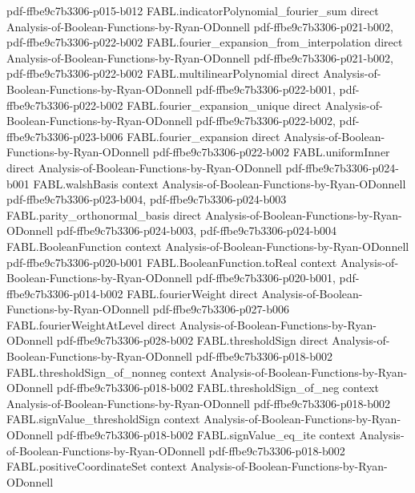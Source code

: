 \begin{theorem}
  {pdf-ffbe9c7b3306-p015-b012}
\proofstep
  {FABL.indicatorPolynomial_fourier_sum}
  {direct}
  {Analysis-of-Boolean-Functions-by-Ryan-ODonnell}
  {pdf-ffbe9c7b3306-p021-b002,
    pdf-ffbe9c7b3306-p022-b002}
\proofstep
  {FABL.fourier_expansion_from_interpolation}
  {direct}
  {Analysis-of-Boolean-Functions-by-Ryan-ODonnell}
  {pdf-ffbe9c7b3306-p021-b002,
    pdf-ffbe9c7b3306-p022-b002}
\proofstep
  {FABL.multilinearPolynomial}
  {direct}
  {Analysis-of-Boolean-Functions-by-Ryan-ODonnell}
  {pdf-ffbe9c7b3306-p022-b001,
    pdf-ffbe9c7b3306-p022-b002}
\proofstep
  {FABL.fourier_expansion_unique}
  {direct}
  {Analysis-of-Boolean-Functions-by-Ryan-ODonnell}
  {pdf-ffbe9c7b3306-p022-b002,
    pdf-ffbe9c7b3306-p023-b006}
\proofstep
  {FABL.fourier_expansion}
  {direct}
  {Analysis-of-Boolean-Functions-by-Ryan-ODonnell}
  {pdf-ffbe9c7b3306-p022-b002}
\proofstep
  {FABL.uniformInner}
  {direct}
  {Analysis-of-Boolean-Functions-by-Ryan-ODonnell}
  {pdf-ffbe9c7b3306-p024-b001}
\proofstep
  {FABL.walshBasis}
  {context}
  {Analysis-of-Boolean-Functions-by-Ryan-ODonnell}
  {pdf-ffbe9c7b3306-p023-b004,
    pdf-ffbe9c7b3306-p024-b003}
\proofstep
  {FABL.parity_orthonormal_basis}
  {direct}
  {Analysis-of-Boolean-Functions-by-Ryan-ODonnell}
  {pdf-ffbe9c7b3306-p024-b003,
    pdf-ffbe9c7b3306-p024-b004}
\proofstep
  {FABL.BooleanFunction}
  {context}
  {Analysis-of-Boolean-Functions-by-Ryan-ODonnell}
  {pdf-ffbe9c7b3306-p020-b001}
\proofstep
  {FABL.BooleanFunction.toReal}
  {context}
  {Analysis-of-Boolean-Functions-by-Ryan-ODonnell}
  {pdf-ffbe9c7b3306-p020-b001,
    pdf-ffbe9c7b3306-p014-b002}
\proofstep
  {FABL.fourierWeight}
  {direct}
  {Analysis-of-Boolean-Functions-by-Ryan-ODonnell}
  {pdf-ffbe9c7b3306-p027-b006}
\proofstep
  {FABL.fourierWeightAtLevel}
  {direct}
  {Analysis-of-Boolean-Functions-by-Ryan-ODonnell}
  {pdf-ffbe9c7b3306-p028-b002}
\proofstep
  {FABL.thresholdSign}
  {direct}
  {Analysis-of-Boolean-Functions-by-Ryan-ODonnell}
  {pdf-ffbe9c7b3306-p018-b002}
\proofstep
  {FABL.thresholdSign_of_nonneg}
  {context}
  {Analysis-of-Boolean-Functions-by-Ryan-ODonnell}
  {pdf-ffbe9c7b3306-p018-b002}
\proofstep
  {FABL.thresholdSign_of_neg}
  {context}
  {Analysis-of-Boolean-Functions-by-Ryan-ODonnell}
  {pdf-ffbe9c7b3306-p018-b002}
\proofstep
  {FABL.signValue_thresholdSign}
  {context}
  {Analysis-of-Boolean-Functions-by-Ryan-ODonnell}
  {pdf-ffbe9c7b3306-p018-b002}
\proofstep
  {FABL.signValue_eq_ite}
  {context}
  {Analysis-of-Boolean-Functions-by-Ryan-ODonnell}
  {pdf-ffbe9c7b3306-p018-b002}
\proofstep
  {FABL.positiveCoordinateSet}
  {context}
  {Analysis-of-Boolean-Functions-by-Ryan-ODonnell}

\end{theorem}
